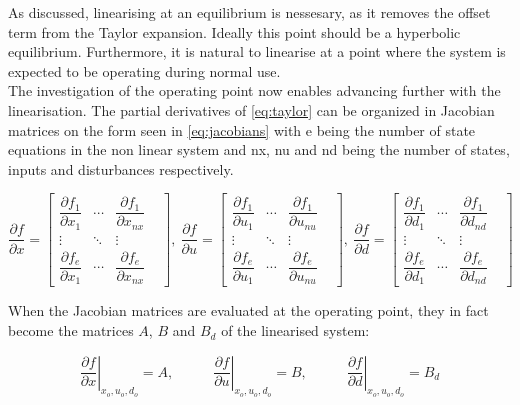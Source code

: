 As discussed, linearising at an equilibrium is nessesary, as it removes the offset term from the Taylor expansion. Ideally this point should be a hyperbolic equilibrium. Furthermore, it is natural to linearise at a point where the system is expected to be operating during normal use. \\

The investigation of the operating point now enables advancing further with the linearisation. The partial derivatives of \cref{eq:taylor} can be organized in Jacobian matrices on the form seen in \cref{eq:jacobians} with e being the number of state equations in the non linear system and nx, nu and nd being the number of states, inputs and disturbances respectively.

\begin{equation} \label{eq:jacobians}
	\dfrac{\partial f}{\partial x} =
	\begin{bmatrix}
		\dfrac{\partial f_1}{\partial x_1} & \cdots & \dfrac{\partial f_1}{\partial x_{nx}} & \\
		\vdots & \ddots & \vdots & \\
		\dfrac{\partial f_e}{\partial x_1} & \cdots & \dfrac{\partial f_e}{\partial x_{nx}} &
	\end{bmatrix}, \
	\dfrac{\partial f}{\partial u} =
	\begin{bmatrix}
		\dfrac{\partial f_1}{\partial u_1} & \cdots & \dfrac{\partial f_1}{\partial u_{nu}} & \\
		\vdots & \ddots & \vdots & \\
		\dfrac{\partial f_e}{\partial u_1} & \cdots & \dfrac{\partial f_e}{\partial u_{nu}} &
	\end{bmatrix}, \
	\dfrac{\partial f}{\partial d} =
	\begin{bmatrix}
		\dfrac{\partial f_1}{\partial d_1} & \cdots & \dfrac{\partial f_1}{\partial d_{nd}} & \\
		\vdots & \ddots & \vdots & \\
		\dfrac{\partial f_e}{\partial d_1} & \cdots & \dfrac{\partial f_e}{\partial d_{nd}} &
	\end{bmatrix}
\end{equation}

When the Jacobian matrices are evaluated at the operating point, they in fact become the matrices $ A $, $ B $ and $ B_d  $ of the linearised system:

\begin{equation}
	\left. \dfrac{\partial f}{\partial x} \right |_{x_o, u_o, d_o} = A, \;\;\;\;\;\;\;\;\;\;
	\left. \dfrac{\partial f}{\partial u} \right |_{x_o, u_o, d_o} = B, \;\;\;\;\;\;\;\;\;\;
	\left. \dfrac{\partial f}{\partial d} \right |_{x_o, u_o, d_o} = B_d
\end{equation}

